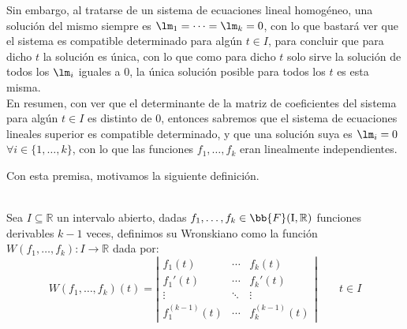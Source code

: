 Sin embargo, al tratarse de un sistema de ecuaciones lineal homogéneo, una solución del mismo siempre es $\lm_1=\cdots = \lm_k=0$, con lo que bastará ver que el sistema es compatible determinado para algún $t\in I$, para concluir que para dicho $t$ la solución es única, con lo que como para dicho $t$ solo sirve la solución de todos los $\lm_i$ iguales a 0, la única solución posible para todos los $t$ es esta misma.\\

En resumen, con ver que el determinante de la matriz de coeficientes del sistema para algún $t\in I$ es distinto de 0, entonces sabremos que el sistema de ecuaciones lineales superior es compatible determinado, y que una solución suya es $\lm_i=0$ $\forall i \in \{1,\ldots,k\}$, con lo que las funciones $f_1,\ldots,f_k$ eran linealmente independientes.

Con esta premisa, motivamos la siguiente definición.

\begin{definicion}[Wronskiano]\ \\
    Sea $I\subseteq \mathbb{R}$ un intervalo abierto, dadas $f_1,\ldots,f_k\in \bb{F}(\text{I},\mathbb{R})$ funciones derivables $k-1$ veces, definimos su Wronskiano como la función $W(f_1,\ldots,f_k):I\rightarrow\mathbb{R}$ dada por:
    \begin{equation*}
        W(f_1,\ldots,f_k)(t) = \left|\begin{array}{ccc}
            f_1(t) & \cdots & f_k(t) \\
            f_1'(t) & \cdots & f_k'(t) \\
            \vdots & \ddots & \vdots \\
            f_1^{(k-1)}(t) & \cdots & f_k^{(k-1)}(t) 
        \end{array}\right| \qquad t\in I
    \end{equation*}
\end{definicion}

